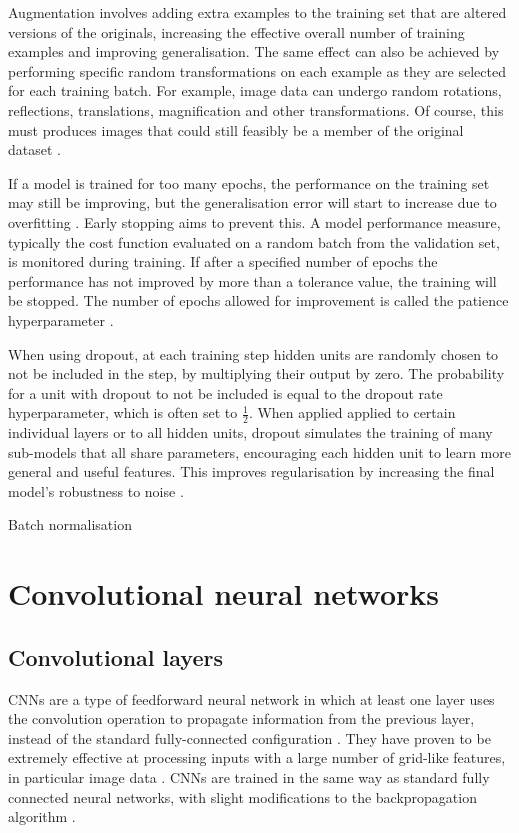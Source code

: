 \documentclass[12pt]{article}
\begin{document}
Augmentation involves adding extra examples to the training set that are altered versions of the originals, increasing the effective overall number of training examples and improving generalisation. The same effect can also be achieved by performing specific random transformations on each example as they are selected for each training batch. For example, image data can undergo random rotations, reflections, translations, magnification and other transformations. Of course, this must produces images that could still feasibly be a member of the original dataset \cite{Goodfellow16}.

If a model is trained for too many epochs, the performance on the training set may still be improving, but the generalisation error will start to increase due to overfitting \cite{Bishop95, Goodfellow16}. Early stopping aims to prevent this. A model performance measure, typically the cost function evaluated on a random batch from the validation set, is monitored during training. If after a specified number of epochs the performance has not improved by more than a tolerance value, the training will be stopped. The number of epochs allowed for improvement is called the patience hyperparameter \cite{Goodfellow16}.

When using dropout, at each training step hidden units are randomly chosen to not be included in the step, by multiplying their output by zero. The probability for a unit with dropout to not be included is equal to the dropout rate hyperparameter, which is often set to $\frac{1}{2}$. When applied applied to certain individual layers or to all hidden units, dropout simulates the training of many sub-models that all share parameters, encouraging each hidden unit to learn more general and useful features. This improves regularisation by increasing the final model's robustness to noise \cite{Srivastava2014}.

Batch normalisation

\section{Convolutional neural networks}
\subsection{Convolutional layers}
CNNs are a type of feedforward neural network in which at least one layer uses the convolution operation to propagate information from the previous layer, instead of the standard fully-connected configuration \cite{Goodfellow16}. They have proven to be extremely effective at processing inputs with a large number of grid-like features, in particular image data \cite{Shrestha19}. CNNs are trained in the same way as standard fully connected neural networks, with slight modifications to the backpropagation algorithm \cite{Bengio93}.
\end{document}
